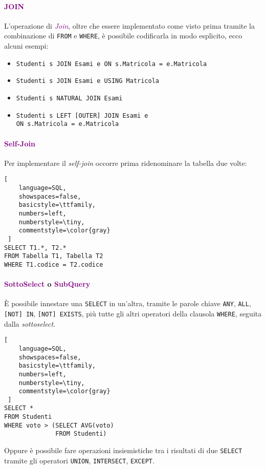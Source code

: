 \paragraph{\textcolor{purple}{JOIN}} L'operazione di \emph{\textcolor{purple}{Join}}, oltre che essere implementato
come visto prima tramite la combinazione di \verb|FROM| e \verb|WHERE|, è possibile codificarla in modo esplicito, ecco alcuni esempi:
\begin{itemize}
    \item \verb|Studenti s JOIN Esami e ON s.Matricola = e.Matricola|
    \item \verb|Studenti s JOIN Esami e USING Matricola|
    \item \verb|Studenti s NATURAL JOIN Esami|
    \item \verb|Studenti s LEFT [OUTER] JOIN Esami e| \\
        \verb|ON s.Matricola = e.Matricola|
\end{itemize}

\paragraph{\textcolor{purple}{Self-Join}} Per implementare il \emph{self-join} occorre prima ridenominare
la tabella due volte:
\begin{lstlisting}[
    language=SQL,
    showspaces=false,
    basicstyle=\ttfamily,
    numbers=left,
    numberstyle=\tiny,
    commentstyle=\color{gray}
 ]
SELECT T1.*, T2.*
FROM Tabella T1, Tabella T2
WHERE T1.codice = T2.codice
\end{lstlisting}

\paragraph{\textcolor{purple}{SottoSelect} o \textcolor{purple}{SubQuery}} È possibile innestare una \verb|SELECT| in un'altra, tramite le parole chiave
\verb|ANY|, \verb|ALL|, \verb|[NOT] IN|, \verb|[NOT] EXISTS|, più tutte gli altri operatori della clausola \verb|WHERE|, seguita dalla \emph{sottoselect}.
\begin{lstlisting}[
    language=SQL,
    showspaces=false,
    basicstyle=\ttfamily,
    numbers=left,
    numberstyle=\tiny,
    commentstyle=\color{gray}
 ]
SELECT *
FROM Studenti
WHERE voto > (SELECT AVG(voto)
              FROM Studenti)
\end{lstlisting}

Oppure è possibile fare operazioni insiemistiche tra i risultati di due \verb|SELECT| tramite gli operatori
\verb|UNION|, \verb|INTERSECT|, \verb|EXCEPT|.

